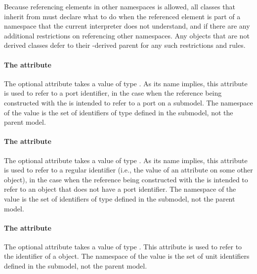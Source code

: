 Because referencing elements in other namespaces is allowed, all classes that inherit from \SBaseRef must declare what to do when the referenced element is part of a namespace that the current interpreter does not understand, and if there are any additional restrictions on referencing other namespaces.  Any \SBaseRef objects that are not derived classes defer to their \SBaseRef-derived parent for any such restrictions and rules.


\paragraph{The \fixttspace{} attribute}
\label{sbaseref-portref}

The optional attribute  takes a value of type .  As its name implies, this attribute is used to refer to a port identifier, in the case when the reference being constructed with the \SBaseRef is intended to refer to a port on a submodel.  The namespace of the  value is the set of identifiers of type  defined in the submodel, not the parent model.


\paragraph{The \fixttspace{} attribute}
\label{sbaseref-idref}

The optional attribute  takes a value of type .  As its name implies, this attribute is used to refer to a regular identifier (i.e., the value of an  attribute on some other object), in the case when the reference being constructed with the \SBaseRef is intended to refer to an object that does not have a port identifier.  The namespace of the  value is the set of identifiers of type  defined in the submodel, not the parent model.


\paragraph{The \fixttspace{} attribute}
\label{sbaseref-unitref}

The optional attribute  takes a value of type .  This attribute is used to refer to the identifier of a \UnitDefinition object.  The namespace of the  value is the set of unit identifiers defined in the submodel, not the parent model.

